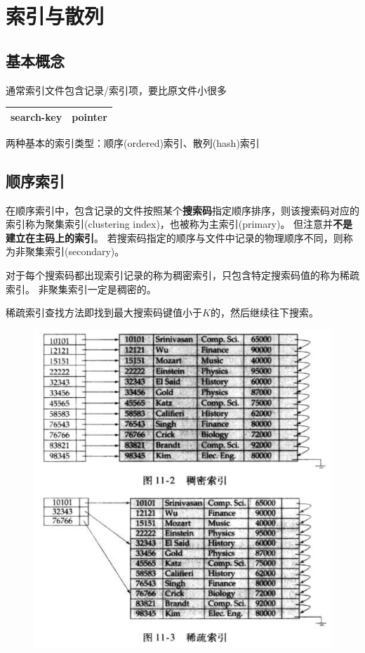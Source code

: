 
\section{索引与散列} %
\subsection{基本概念}
通常索引文件包含记录/索引项，要比原文件小很多
\begin{center}
\begin{tabular}{|c|c|}\hline
search-key & pointer\\\hline
\end{tabular}
\end{center}

两种基本的索引类型：顺序(ordered)索引、散列(hash)索引

\subsection{顺序索引}
\begin{definition}[聚集索引]
在顺序索引中，包含记录的文件按照某个\textbf{搜索码}指定顺序排序，则该搜索码对应的索引称为聚集索引(clustering index)，也被称为主索引(primary)。
但注意并\textbf{不是建立在主码上的索引}。
若搜索码指定的顺序与文件中记录的物理顺序不同，则称为非聚集索引(secondary)。
\end{definition}
\begin{definition}[稠密/稀疏索引]
对于每个搜索码都出现索引记录的称为稠密索引，只包含特定搜索码值的称为稀疏索引。
非聚集索引一定是稠密的。
\end{definition}

稀疏索引查找方法即找到最大搜索码键值小于$K$的，然后继续往下搜索。
\begin{figure}[H]
\centering
\includegraphics[width=0.6\linewidth]{fig/dense_sparse_indexing.png}
\end{figure}


